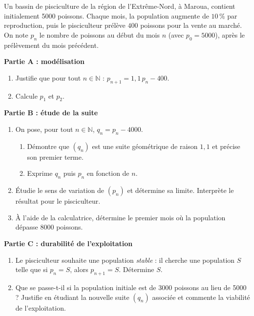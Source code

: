 \documentclass[11pt]{article}
\begin{document}
\begin{exercice}
Un bassin de pisciculture de la région de l'Extrême-Nord, à Maroua, contient initialement \num{5000} poissons. Chaque mois, la population augmente de $10\,\%$ par reproduction, puis le pisciculteur prélève $400$ poissons pour la vente au marché. On note $p_n$ le nombre de poissons au début du mois $n$ (avec $p_0 = \num{5000}$), après le prélèvement du mois précédent.

\textbf{Partie A : modélisation}
\begin{enumerate}
\item Justifie que pour tout $n \in \mathbb{N}$ : $p_{n+1} = 1{,}1\, p_n - 400$.
\item Calcule $p_1$ et $p_2$.
\end{enumerate}

\textbf{Partie B : étude de la suite}
\begin{enumerate}
\item On pose, pour tout $n \in \mathbb{N}$, $q_n = p_n - \num{4000}$.
\begin{enumerate}
\item Démontre que $(q_n)$ est une suite géométrique de raison $1{,}1$ et précise son premier terme.
\item Exprime $q_n$ puis $p_n$ en fonction de $n$.
\end{enumerate}
\item Étudie le sens de variation de $(p_n)$ et détermine sa limite. Interprète le résultat pour le pisciculteur.
\item À l'aide de la calculatrice, détermine le premier mois où la population dépasse \num{8000} poissons.
\end{enumerate}

\textbf{Partie C : durabilité de l'exploitation}
\begin{enumerate}
\item Le pisciculteur souhaite une population \emph{stable} : il cherche une population $S$ telle que si $p_n = S$, alors $p_{n+1} = S$. Détermine $S$.
\item Que se passe-t-il si la population initiale est de \num{3000} poissons au lieu de \num{5000} ? Justifie en étudiant la nouvelle suite $(q_n)$ associée et commente la viabilité de l'exploitation.
\end{enumerate}
\end{exercice}
\end{document}
